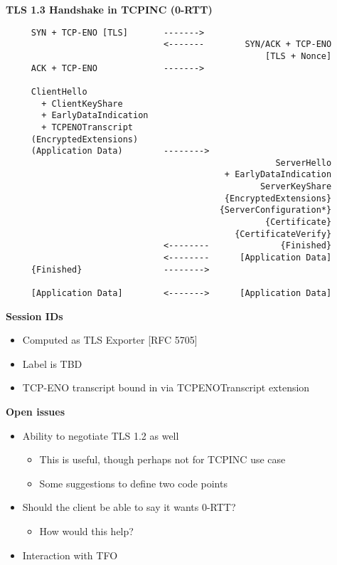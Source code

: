 \documentclass[helvetica]{seminar}
\newcommand{\heading}[1]{%
  \begin{center} 
    \large\bf 
    #1 
  \end{center} 
  \vspace{.4 in}}
\begin{document}
\begin{slide}
\heading{TLS 1.3 Handshake in TCPINC (0-RTT)}

\begin{scriptsize}
\begin{verbatim}
     SYN + TCP-ENO [TLS]       ------->
                               <-------        SYN/ACK + TCP-ENO
                                                   [TLS + Nonce]
     ACK + TCP-ENO             ------->

     ClientHello
       + ClientKeyShare
       + EarlyDataIndication
       + TCPENOTranscript
     (EncryptedExtensions)
     (Application Data)        -------->
                                                     ServerHello
                                           + EarlyDataIndication
                                                  ServerKeyShare
                                           {EncryptedExtensions}
                                          {ServerConfiguration*}
                                                   {Certificate}
                                             {CertificateVerify}
                               <--------              {Finished}
                               <--------      [Application Data]
     {Finished}                -------->

     [Application Data]        <------->      [Application Data]
\end{verbatim}
\end{scriptsize}
\end{slide}


\begin{slide}
\heading{Session IDs}

\begin{itemize}
\item Computed as TLS Exporter [RFC 5705]
\item Label is TBD
\item TCP-ENO transcript bound in via TCPENOTranscript extension
\end{itemize}
\end{slide}


\begin{slide}
\heading{Open issues}

\begin{itemize}
\item Ability to negotiate TLS 1.2 as well
  \begin{itemize}
  \item This is useful, though perhaps not for TCPINC use case
  \item Some suggestions to define two code points
  \end{itemize}

\item Should the client be able to say it wants 0-RTT?
  \begin{itemize}
  \item How would this help?
  \end{itemize}

\item Interaction with TFO
\end{itemize}

\end{slide}
\end{document}
